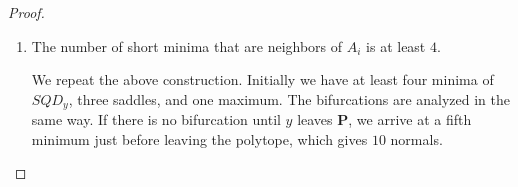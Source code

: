 \documentclass[10pt,a4paper]{amsart}
\begin{document}
\begin{proof}
\begin{enumerate}
(c) One of the saddles $s_i$ dies. This happens in two cases:
(i) $s_i$ meets a  maximum of $SQD_y$. The maximum cannot be $V$ since  $s_i$ slides away from $V$.
It is not any other maximum $V'$. Indeed, recall
that $s_i$ is the orthogonal projection of $y$ to the edge. If $s_i$
meets $V'$ before $y$ leaves $\mathbf{P}$, then $|Vy|>|VV'|$. Then $V'$ can't be maximum of $SQD_y$ when $y=V$.
(ii) $s_i$ meets a minimum. It can be none of $m_1$, $m_2$, and $m_3$, so
right before the bifurcation, the function $SQD_y$ has $4$ minima and $2$ maxima, which proves the claim.

\item The number of short minima that are neighbors of $A_i$ is at least $4$. 

 We repeat the above construction. Initially we have at least four minima of $SQD_y$, three saddles, and  one  maximum.  The bifurcations are analyzed in the same way. If there is no bifurcation until $y$ leaves $\mathbf{P}$, we arrive at a fifth minimum just before leaving the polytope, which gives $10$ normals.



    
\end{enumerate}

    
\end{proof}
\end{document}
